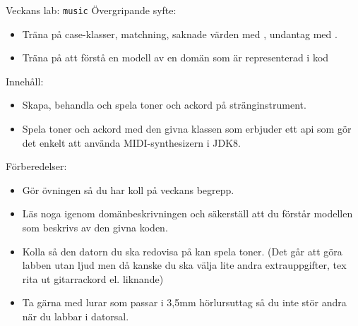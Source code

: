 


%
%


\begin{Slide}{Veckans lab: \texttt{music}}\SlideFontSmall
Övergripande syfte:
\begin{itemize}
\item Träna på case-klasser, matchning, saknade värden med , undantag med .
\item Träna på att förstå en modell av en domän som är representerad i kod
\end{itemize}

Innehåll:
\begin{itemize}
\item Skapa, behandla och spela toner och ackord på stränginstrument.
\item Spela toner och ackord med den givna klassen  som erbjuder ett api som gör det enkelt att använda MIDI-synthesizern i JDK8.
\end{itemize}

Förberedelser:
\begin{itemize}
  \item Gör övningen så du har koll på veckans begrepp.
  \item Läs noga igenom domänbeskrivningen och säkerställ att du förstår modellen som beskrivs av den givna koden.
  \item Kolla så den datorn du ska redovisa på kan spela toner. (Det går att göra labben utan ljud men då kanske du ska välja lite andra extrauppgifter, tex rita ut gitarrackord el. liknande)
  \item Ta gärna med lurar som passar i 3,5mm hörlursuttag så du inte stör andra när du labbar i datorsal.
\end{itemize}

\end{Slide}

